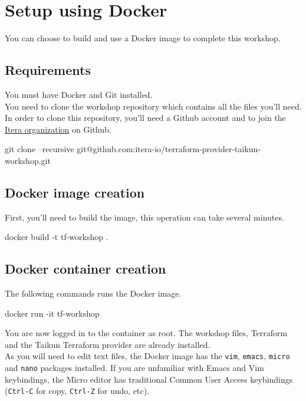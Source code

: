 \section{Setup using Docker}\label{sec:docker}

You can choose to build and use a Docker image to complete this workshop.

\subsection{Requirements}

You must have Docker and Git installed.\\
You need to clone the workshop repository which contains all the files you'll need.\\
In order to clone this repository, you'll need a Github account and to join the \href{https://github.com/itera-io}{Itera organization} on Github.

\begin{shell}
git clone --recursive git@github.com:itera-io/terraform-provider-taikun-workshop.git
\end{shell}

\subsection{Docker image creation}

First, you'll need to build the image, this operation can take several minutes.

\begin{shell}
docker build -t tf-workshop .
\end{shell}

\subsection{Docker container creation}

The following commands runs the Docker image.
\begin{shell}
docker run -it tf-workshop
\end{shell}
You are now logged in to the container as root. The workshop files,
Terraform and the Taikun Terraform provider are already installed.\\

As you will need to edit text files, the Docker image has the \texttt{vim},
\texttt{emacs}, \texttt{micro} and \texttt{nano} packages installed.
If you are unfamiliar with Emacs and Vim keybindings, the Micro editor
has traditional Common User Access keybindings (\texttt{Ctrl-C} for copy,
\texttt{Ctrl-Z} for undo, etc).
